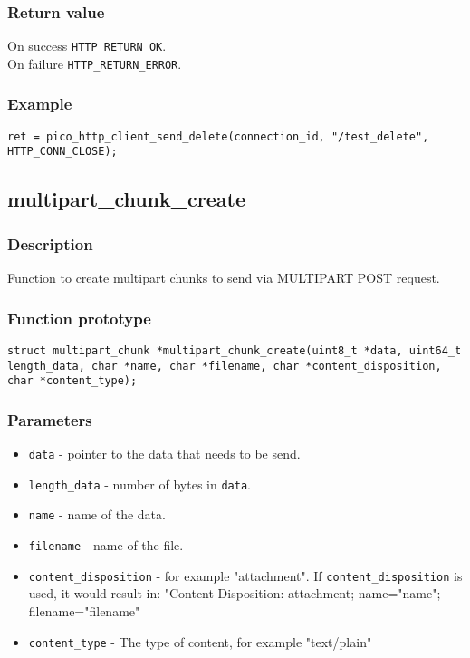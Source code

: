 \subsubsection*{Return value}
On success \texttt{HTTP\_RETURN\_OK}.
\\On failure \texttt{HTTP\_RETURN\_ERROR}.
\subsubsection*{Example}
\begin{verbatim}
ret = pico_http_client_send_delete(connection_id, "/test_delete", HTTP_CONN_CLOSE);
\end{verbatim}


\subsection{multipart\_chunk\_create}

\subsubsection*{Description}
Function to create multipart chunks to send via MULTIPART POST request.

\subsubsection*{Function prototype}
\texttt{struct multipart\_chunk *multipart\_chunk\_create(uint8\_t *data, uint64\_t length\_data, char *name, char *filename, char *content\_disposition, char *content\_type);}

\subsubsection*{Parameters}
\begin{itemize}[noitemsep]
\item \texttt{data} - pointer to the data that needs to be send.
\item \texttt{length\_data} - number of bytes in \texttt{data}.
\item \texttt{name} - name of the data.
\item \texttt{filename} - name of the file.
\item \texttt{content\_disposition} - for example "attachment". If \texttt{content\_disposition} is used, it would result in: "Content-Disposition: attachment; name="name"; filename="filename"
\item \texttt{content\_type} - The type of content, for example "text/plain"
\end{itemize}

